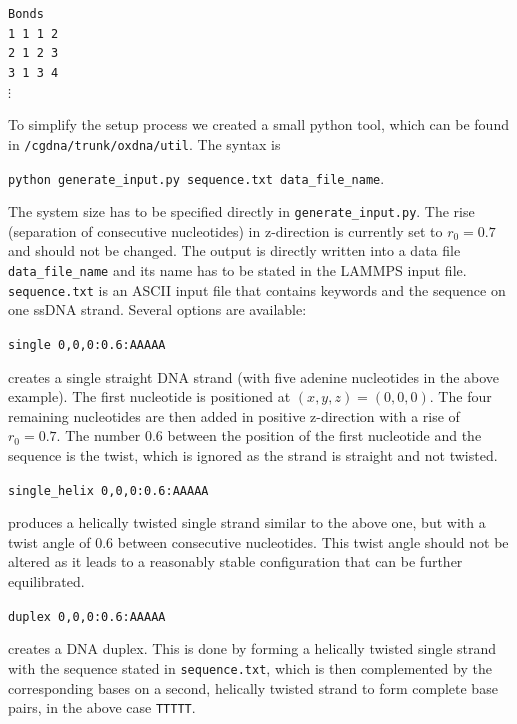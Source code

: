 \documentclass[12pt,onecolumn]{article}
\begin{document}
\smallskip
\texttt{Bonds\\
\vspace*{0.3cm}
1       1       1       2\\
2       1       2       3\\
3       1       3       4\\
$\vdots$
}
\smallskip

\noindent To simplify the setup process we created a small python tool, which can be found
in \newline \texttt{/cgdna/trunk/oxdna/util}. The syntax is

\smallskip
\texttt{python generate\_input.py sequence.txt data\_file\_name}. 
\smallskip

\noindent The system size has to be specified directly in \texttt{generate\_input.py}. 
The rise (separation of consecutive nucleotides) in z-direction is currently set to 
$r_0=0.7$ and should not be changed.
The output is directly written into a data file \texttt{data\_file\_name} and its name has to be stated in 
the LAMMPS input file. \texttt{sequence.txt} is an ASCII input file that contains 
keywords and the sequence on one ssDNA strand. Several options are available:

\smallskip
\texttt{single 0,0,0:0.6:AAAAA} 
\smallskip

\noindent creates a single straight DNA strand (with five adenine nucleotides in the above example). 
The first nucleotide is
positioned at $(x,y,z)=(0,0,0)$. The four remaining nucleotides are then added in positive
z-direction with a rise of $r_0=0.7$. The number $0.6$ between the position of the first nucleotide 
and the sequence is the twist, which is ignored as the strand is straight and not twisted.  

\smallskip
\texttt{single\_helix 0,0,0:0.6:AAAAA}
\smallskip

\noindent produces a helically twisted single strand similar to the above one, but with a twist angle of $0.6$
between consecutive nucleotides. This twist angle should not be altered as it leads to a reasonably 
stable configuration that can be further equilibrated.

\smallskip
 \texttt{duplex 0,0,0:0.6:AAAAA}
\smallskip

\noindent creates a DNA duplex. This is done by forming a helically twisted single strand with the sequence stated
in \texttt{sequence.txt}, which is then complemented by the corresponding bases on a second, helically twisted 
strand to form complete base pairs, in the above case \texttt{TTTTT}.
 
\end{document}
